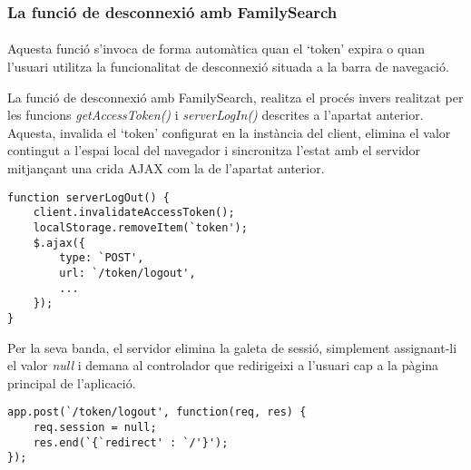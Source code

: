 \subsubsection{La funció de desconnexió amb FamilySearch}

\paragraph{}
Aquesta funció s'invoca de forma automàtica quan el `token' expira o quan l'usuari utilitza la funcionalitat de desconnexió situada a la barra de navegació.

La funció de desconnexió amb FamilySearch, realitza el procés invers realitzat per les funcions \emph{getAccessToken()} i \emph{serverLogIn()} descrites a l'apartat anterior. Aquesta, invalida el `token' configurat en la instància del client, elimina el valor contingut a l'espai local del navegador i sincronitza l'estat amb el servidor mitjançant una crida AJAX com la de l'apartat anterior.

\begin{lstlisting}[style=rawOwn,caption={Cridar AJAX al servidor per indicar que l'usuari s'ha desconnectat}]
function serverLogOut() {
    client.invalidateAccessToken();
    localStorage.removeItem(`token');
    $.ajax({
        type: `POST',
        url: `/token/logout',
        ...
    });
}
\end{lstlisting}

Per la seva banda, el servidor elimina la galeta de sessió, simplement assignant-li el valor \emph{null} i demana al controlador que redirigeixi a l'usuari cap a la pàgina principal de l'aplicació.

\begin{lstlisting}[style=rawOwn,caption={Petició POST de desconnexió processada pel servidor}]
app.post(`/token/logout', function(req, res) {
    req.session = null;
    res.end(`{`redirect' : `/'}');
});
\end{lstlisting}
